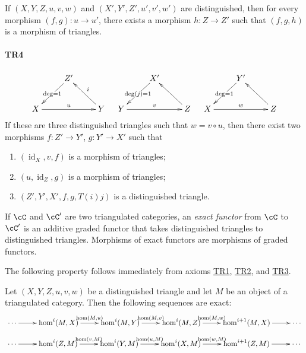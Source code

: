 If $(X,Y,Z,u,v,w)$ and $(X',Y',Z',u',v',w')$ are distinguished, then for
every morphism $(f,g):u\to u'$, there exists a morphism $h:Z\to Z'$ such
that $(f,g,h)$ is a morphism of triangles.

\paragraph{TR4}
\hypertarget{VIII:TR4}{}

\[\xymatrix{
  & Z' \ar[dl]|{\deg=1} \\
  X \ar[rr]^-u
    & & Y \ar[ul]_-i
}\quad
\xymatrix{
  & X' \ar[dl]|{\deg(j)=1} \\
  Y \ar[rr]^-v
    & & Z \ar[ul]
}\quad
\xymatrix{
  & Y' \ar[dl]|{\deg=1} \\
  X \ar[rr]^-w
    & & Z \ar[ul]
}\]
If these are three distinguished triangles such that $w=v\circ u$, then
there exist two morphisms $f:Z'\to Y'$, $g:Y' \to X'$ such that
\begin{enumerate}
  \item $(\operatorname{id}_X, v, f)$ is a morphism of triangles;
  \item $(u,\operatorname{id}_Z,g)$ is a morphism of triangles;
  \item $(Z',Y',X',f,g,T(i) j)$ is a distinguished triangle.
\end{enumerate}

If $\cC$ and $\cC'$ are two triangulated categories, an \emph{exact
functor} from $\cC$ to $\cC'$ is an additive graded functor that takes
distinguished triangles to distinguished triangles. Morphisms of exact
functors are morphisms of graded functors.

The following property follows immediately from axioms
\hyperlink{VIII:TR1}{TR1}, \hyperlink{VIII:TR2}{TR2}, and
\hyperlink{VIII:TR3}{TR3}.

\begin{proposition}\label{VIII:1-1-2}
Let $(X,Y,Z,u,v,w)$ be a distinguished triangle and let $M$ be an object
of a triangulated category. Then the following sequences are exact:
\[\xymatrix{
  \cdots \ar[r]
    & \hom^i(M,X) \ar[r]^-{\hom(M,u)}
    & \hom^i(M,Y) \ar[r]^-{\hom(M,v)}
    & \hom^i(M,Z) \ar[r]^-{\hom(M,w)}
    & \hom^{i+1}(M,X) \ar[r]
    & \cdots
}\]
\[\xymatrix{
  \cdots \ar[r]
    & \hom^i(Z,M) \ar[r]^-{\hom(v,M)}
    & \hom^i(Y,M) \ar[r]^-{\hom(u,M)}
    & \hom^i(X,M) \ar[r]^-{\hom(w,M)}
    & \hom^{i+1}(Z,M) \ar[r]
    & \cdots
}\]
\end{proposition}

